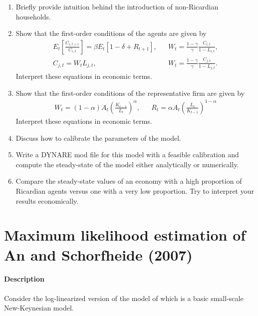 \documentclass{article}
\begin{document}
\begin{enumerate}

\item Briefly provide intuition behind the introduction of non-Ricardian households.

\item Show that the first-order conditions of the agents are given by
\begin{align*}
E_t\left[\frac{C_{i,t+1}}{C_{i,t}}\right] = \beta E_t\left[1-\delta + R_{t+1}\right],
&&
W_t = \frac{1-\gamma}{\gamma} \frac{C_{i,t}}{1-L_{i,t}},
\\
C_{j,t} = W_t L_{j,t},
&&
W_t = \frac{1-\gamma}{\gamma} \frac{C_{j,t}}{1-L_{j,t}}.
\end{align*}
Interpret these equations in economic terms.

\item Show that the first-order conditions of the representative firm are given by
\begin{align*}
W_t = (1-\alpha) A_t \left(\frac{K_{t-1}}{L_t}\right)^\alpha, &&	R_t = \alpha A_t \left(\frac{L_t}{K_{t-1}}\right)^{1-\alpha}
\end{align*}
Interpret these equations in economic terms.

\item Discuss how to calibrate the parameters of the model.

\item Write a DYNARE mod file for this model with a feasible calibration
  and compute the steady-state of the model either analytically or numerically.

\item Compare the steady-state values of an economy with a high proportion of Ricardian agents versus one with a very low proportion.
Try to interpret your results economically.
\end{enumerate}

\newpage

\section[Maximum likelihood estimation of An and Schorfheide (2007)]{Maximum likelihood estimation of An and Schorfheide (2007)\label{ex:AnSchorfheide2007ML}}
\paragraph{Description}
Consider the log-linearized version of the model of \textcite{An.Schorfheide_2007_BayesianAnalysisDSGE}
  which is a basic small-scale New-Keynesian model.
\end{document}
